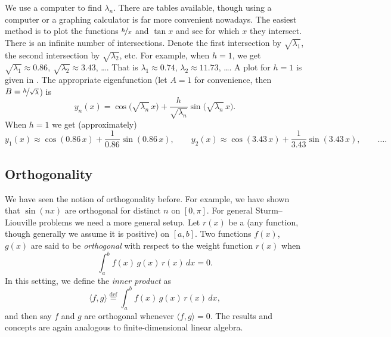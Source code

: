 \begin{example}
We use a computer to find $\lambda_n$.  There are tables available,
though using a computer or a graphing calculator
is far more convenient nowadays.
The easiest method is to plot the functions 
$\nicefrac{h}{x}$ and $\tan x$ and see for which $x$ they intersect.
There is an infinite number of intersections.  Denote
the first intersection
by $\sqrt{\lambda_1}$,
the second intersection by $\sqrt{\lambda_2}$, etc.
For example, when
$h=1$, we get $\sqrt{\lambda_1} \approx 0.86$, 
$\sqrt{\lambda_2} \approx 3.43$, \ldots.
That is $\lambda_1 \approx 0.74$, $\lambda_2 \approx 11.73$, \ldots.
A plot for $h=1$ is given in .
The appropriate eigenfunction
(let $A = 1$ for convenience, then
$B=\nicefrac{h}{\sqrt{\lambda}}$) is
\begin{equation*}
y_n(x) = \cos \bigl( \sqrt{\lambda_n}\, x \bigr) + \frac{h}{\sqrt{\lambda_n}}
\sin \bigl(\sqrt{\lambda_n} \, x \bigr) .
\end{equation*}
When $h=1$ we get (approximately)
\begin{equation*}
y_1(x) \approx \cos (0.86\, x ) + \frac{1}{0.86}
\sin (0.86 \, x ) , \qquad
y_2(x) \approx \cos (3.43\, x ) + \frac{1}{3.43}
\sin (3.43 \, x ) , \qquad \ldots .
\end{equation*}
\begin{myfig}
\capstart
{}
\caption{Plot of $\frac{1}{x}$ and $\tan x$.%
\label{sl:tanx1overxfig}}
\end{myfig}
\end{example}

\subsection{Orthogonality}

We have seen the notion of orthogonality before.  For example,
we have shown that $\sin (nx)$ are orthogonal for distinct $n$ on $[0,\pi]$.
For general Sturm--Liouville problems we need a more general setup.
Let $r(x)$
be a \emph{} (any function, though generally we
assume it is positive) on $[a,b]$.  Two functions $f(x)$, $g(x)$
are said to be
\emph{orthogonal} 
with respect to the weight function
$r(x)$ when
\begin{equation*}
\int_a^b f(x) \, g(x) \, r(x) \,dx = 0 .
\end{equation*}
In this setting,
we define the \emph{inner product} as
\begin{equation*}
\langle f , g \rangle \overset{\text{def}}{=} \int_a^b f(x) \, g(x) \, r(x)
\,dx ,
\end{equation*}
and then say $f$ and $g$ are orthogonal whenever $\langle f , g \rangle = 0$.
The results and concepts are again analogous to 
finite-dimensional linear algebra.

